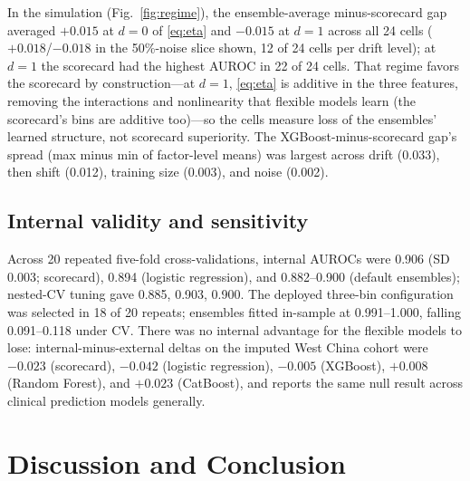 \documentclass[conference]{IEEEtran}
\begin{document}
In the simulation (Fig.~\ref{fig:regime}), the ensemble-average
minus-scorecard gap averaged $+0.015$ at $d=0$ of \eqref{eq:eta} and
$-0.015$ at $d=1$ across all 24 cells ($+0.018$/$-0.018$ in the
50\%-noise slice shown, 12 of 24 cells per
drift level); at $d=1$ the scorecard had the highest AUROC in 22 of
24 cells. That regime favors the scorecard by construction---at
$d=1$, \eqref{eq:eta} is additive in the three features, removing
the interactions and nonlinearity that flexible models learn (the
scorecard's bins are additive too)---so the cells measure loss
of the ensembles' learned structure, not scorecard superiority.
The
XGBoost-minus-scorecard gap's spread (max minus min of factor-level means) was largest
across drift (0.033), then shift (0.012), training size (0.003),
and noise (0.002).

\subsection{Internal validity and sensitivity}
\label{sec:internal}

Across 20 repeated five-fold cross-validations, internal AUROCs were
0.906 (SD 0.003; scorecard), 0.894 (logistic regression), and
0.882--0.900 (default ensembles); nested-CV tuning gave 0.885,
0.903, 0.900.
The deployed three-bin configuration was selected in 18 of 20
repeats; ensembles fitted in-sample at 0.991--1.000, falling
0.091--0.118 under CV. There was no internal advantage for the
flexible models to lose: internal-minus-external deltas on the
imputed West China cohort were
$-0.023$ (scorecard), $-0.042$ (logistic
regression), $-0.005$ (XGBoost), $+0.008$ (Random Forest), and
$+0.023$ (CatBoost), and \cite{christodoulou2019} reports the same
null result across clinical prediction models generally.

\section{Discussion and Conclusion}
\end{document}
